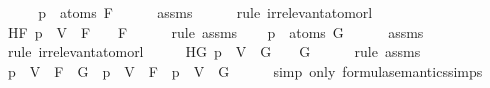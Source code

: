 \begin{isabellebody}
%
\isadelimproof
%
\endisadelimproof
%
\isatagproof
{}\isamarkupfalse%
\ {\isacharminus}\isanewline
\ \ \isamarkupfalse%
\ {\isachardoublequoteopen}p\ {\isasymnotin}\ atoms\ F{\isachardoublequoteclose}\isanewline
\ \ \ \ \isamarkupfalse%
\ assms{\isacharparenleft}{}{\isacharparenright}\isanewline
\ \ \ \ \isamarkupfalse%
\ {\isacharparenleft}rule\ irrelevant{\isacharunderscore}atom{\isacharunderscore}or{\isacharunderscore}l{}{\isacharparenright}\isanewline
\ \ \isamarkupfalse%
\ \isamarkupfalse%
\ HF{\isacharcolon}\ {\isachardoublequoteopen}{\isasymA}{\isacharparenleft}p\ {\isacharcolon}{\isacharequal}\ V{\isacharparenright}\ {\isasymTurnstile}\ F\ {\isasymlongleftrightarrow}\ {\isasymA}\ {\isasymTurnstile}\ F{\isachardoublequoteclose}\isanewline
\ \ \ \ \isamarkupfalse%
\ {\isacharparenleft}rule\ assms{\isacharparenleft}{}{\isacharparenright}{\isacharparenright}\isanewline
\ \ \isamarkupfalse%
\ {\isachardoublequoteopen}p\ {\isasymnotin}\ atoms\ G{\isachardoublequoteclose}\isanewline
\ \ \ \ \isamarkupfalse%
\ assms{\isacharparenleft}{}{\isacharparenright}\isanewline
\ \ \ \ \isamarkupfalse%
\ {\isacharparenleft}rule\ irrelevant{\isacharunderscore}atom{\isacharunderscore}or{\isacharunderscore}l{}{\isacharparenright}\isanewline
\ \ \isamarkupfalse%
\ \isamarkupfalse%
\ HG{\isacharcolon}\ {\isachardoublequoteopen}{\isasymA}{\isacharparenleft}p\ {\isacharcolon}{\isacharequal}\ V{\isacharparenright}\ {\isasymTurnstile}\ G\ {\isasymlongleftrightarrow}\ {\isasymA}\ {\isasymTurnstile}\ G{\isachardoublequoteclose}\isanewline
\ \ \ \ \isamarkupfalse%
\ {\isacharparenleft}rule\ assms{\isacharparenleft}{}{\isacharparenright}{\isacharparenright}\isanewline
\ \ \isamarkupfalse%
\ {\isachardoublequoteopen}{\isasymA}{\isacharparenleft}p\ {\isacharcolon}{\isacharequal}\ V{\isacharparenright}\ {\isasymTurnstile}\ {\isacharparenleft}F\ \isactrlbold {\isasymor}\ G{\isacharparenright}\ {\isacharequal}\ {\isacharparenleft}{\isasymA}{\isacharparenleft}p\ {\isacharcolon}{\isacharequal}\ V{\isacharparenright}\ {\isasymTurnstile}\ F\ {\isasymor}\ {\isasymA}{\isacharparenleft}p\ {\isacharcolon}{\isacharequal}\ V{\isacharparenright}\ {\isasymTurnstile}\ G{\isacharparenright}{\isachardoublequoteclose}\isanewline
\ \ \ \ \isamarkupfalse%
\ {\isacharparenleft}simp\ only{\isacharcolon}\ formula{\isacharunderscore}semantics{\isachardot}simps{\isacharparenleft}{}{\isacharparenright}{\isacharparenright}\isanewline

\end{isabellebody}
